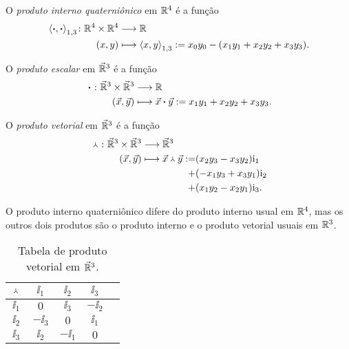 \begin{definition}
O \emph{produto interno quaterniônico} em $\mathbb{R}^4$ é a função
	\begin{align*}
	{\left\langle{\bm{\cdot}},{\bm{\cdot}}\right\rangle_{1,3}}\colon {\mathbb{R}^4 \times \mathbb{R}^4} &\longrightarrow {\mathbb{R}} \\{(x,y)} &\longmapsto \left\langle{x},{y}\right\rangle_{1,3} := x_0y_0 - (x_1y_1 + x_2y_2 + x_3y_3).
	\end{align*}

	O \emph{produto escalar} em $\vec{\mathbb{R}}^3$ é a função
	\begin{align*}
	{{} \bm{\cdot} {}}\colon {\vec{\mathbb{R}}^3 \times \vec{\mathbb{R}}^3} &\longrightarrow {\mathbb{R}} \\{(\vec{x},\vec{y})} &\longmapsto {\vec{x}} \bm{\cdot} {\vec{y}} := x_1y_1 + x_2y_2 + x_3y_3.
	\end{align*}

O \emph{produto vetorial} em $\vec{\mathbb{R}}^3$ é a função
	\begin{align*}
	\func{\pvec{}{}}{\vec{\R}^3 \times \vec{\R}^3}{\vec{\R}^3}{(\vec{x},\vec{y})}{
		\begin{aligned}[t]
			\pvec{\vec{x}}{\vec{y}} := &(x_2y_3-x_3y_2) \ii_1 \\
			+ &(-x_1y_3+x_3y_1) \ii_2 \\
			+ &(x_1y_2-x_2y_1) \ii_3.
		\end{aligned}
	}
	\end{align*}
\end{definition}

O produto interno quaterniônico difere do produto interno usual em $\mathbb{R}^4$, mas os outros dois produtos são o produto interno e o produto vetorial usuais em $\mathbb{R}^3$.

\begin{table}
	\centering

	\begin{tabular}{c | c c c c}
	\toprule
	${} \Yup {}$&	$\ii_1$	&	$\ii_2$	&	$\ii_3$	\\
	\hline
	$\ii_1$	&	$0$		&	$\ii_3$	&	$-\ii_2$	\\
	$\ii_2$	&	$-\ii_3$&	$0$		&	$\ii_1$		\\
	$\ii_3$	&	$\ii_2$	&	$-\ii_1$&	$0$			\\
	\bottomrule
	\end{tabular}

	\caption{Tabela de produto vetorial em $\vec{\mathbb{R}}^3$.}
	\label{tab:multiplicacao.quaternionica.vetorial}
\end{table}

